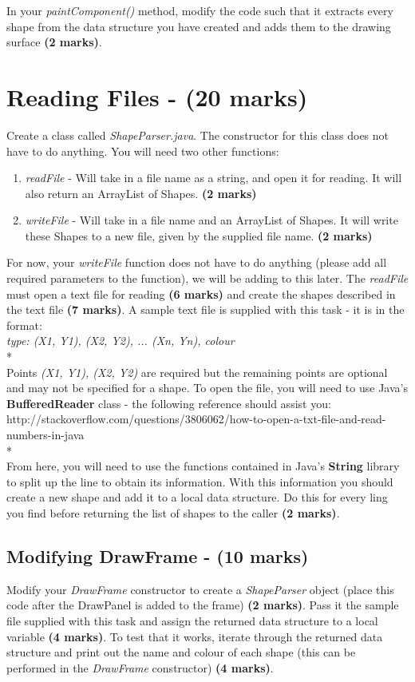 \documentclass[a4paper,12pt]{article}
\begin{document}
In your \textit{paintComponent()} method, modify the code such that it extracts every shape from the data structure you have created and adds them to the drawing surface {\bf (2 marks)}.

\newpage
\section{Reading Files - (20 marks)}
Create a class called \textit{ShapeParser.java}. The constructor for this class does not have to do anything. You will need two other functions:
\begin{enumerate}
\item \textit{readFile} - Will take in a file name as a string, and open it for reading. It will also return an ArrayList of Shapes. {\bf (2 marks)}
\item \textit{writeFile} - Will take in a file name and an ArrayList of Shapes. It will write these Shapes to a new file, given by the supplied file name. {\bf (2 marks)}
\end{enumerate}
For now, your \textit{writeFile} function does not have to do anything (please add all required parameters to the function), we will be adding to this later. The \textit{readFile} must open a text file for reading {\bf (6 marks)} and create the shapes described in the text file {\bf (7 marks)}. A sample text file is supplied with this task - it is in the format:\\

\textit{type: (X1, Y1), (X2, Y2), ... (Xn, Yn), colour}\\*
\\
Points \textit{(X1, Y1), (X2, Y2)} are required but the remaining points are optional and may not be specified for a shape. To open the file, you will need to use Java's {\bf BufferedReader} class - the following reference should assist you:\\

http://stackoverflow.com/questions/3806062/how-to-open-a-txt-file-and-read-numbers-in-java\\*
\\
From here, you will need to use the functions contained in Java's {\bf String} library to split up the line to obtain its information. With this information you should create a new shape and add it to a local data structure. Do this for every ling you find before returning the list of shapes to the caller {\bf (2 marks)}. 

\subsection{Modifying DrawFrame - (10 marks)}
Modify your \textit{DrawFrame} constructor to create a \textit{ShapeParser} object (place this code after the DrawPanel is added to the frame) {\bf (2 marks)}. Pass it the sample file supplied with this task and assign the returned data structure to a local variable {\bf (4 marks)}. To test that it works, iterate through the returned data structure and print out the name and colour of each shape (this can be performed in the \textit{DrawFrame} constructor) {\bf (4 marks)}.
\end{document}
